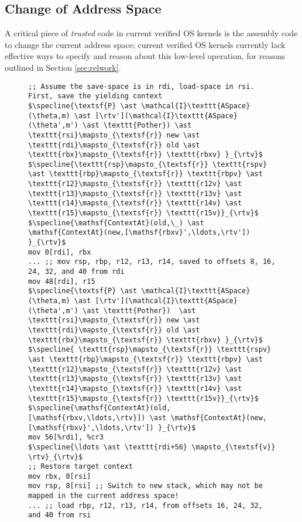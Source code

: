 \subsection{Change of Address Space}
A critical piece of \emph{trusted} code in current verified OS kernels is the assembly code to change the current address space; current verified OS kernels currently 
lack effective ways to specify and reason about this low-level operation, for reasons outlined in Section \ref{sec:relwork}.
\begin{figure}\footnotesize
\begin{lstlisting}[mathescape]
;; Assume the save-space is in rdi, load-space in rsi. First, save the yielding context
$\specline{\textsf{P} \ast \mathcal{I}\texttt{ASpace}(\theta,m) \ast [\rtv'](\mathcal{I}\texttt{ASpace}(\theta',m') \ast \texttt{Pother}) \ast \texttt{rsi}\mapsto_{\textsf{r}} new \ast \texttt{rdi}\mapsto_{\textsf{r}} old \ast \texttt{rbx}\mapsto_{\textsf{r}} \texttt{rbxv} }_{\rtv}$
$\specline{\texttt{rsp}\mapsto_{\textsf{r}} \texttt{rspv} \ast \texttt{rbp}\mapsto_{\textsf{r}} \texttt{rbpv} \ast \texttt{r12}\mapsto_{\textsf{r}} \texttt{r12v} \ast \texttt{r13}\mapsto_{\textsf{r}} \texttt{r13v} \ast \texttt{r14}\mapsto_{\textsf{r}} \texttt{r14v} \ast \texttt{r15}\mapsto_{\textsf{r}} \texttt{r15v}}_{\rtv}$
$\specline{\mathsf{ContextAt}(old,\_) \ast \mathsf{ContextAt}(new,[\mathsf{rbxv}',\ldots,\rtv']) }_{\rtv}$
mov 0[rdi], rbx
... ;; mov rsp, rbp, r12, r13, r14, saved to offsets 8, 16, 24, 32, and 40 from rdi
mov 48[rdi], r15
$\specline{\textsf{P} \ast \mathcal{I}\texttt{ASpace}(\theta,m) \ast [\rtv'](\mathcal{I}\texttt{ASpace}(\theta',m') \ast \texttt{Pother})  \ast  \texttt{rsi}\mapsto_{\textsf{r}} new \ast \texttt{rdi}\mapsto_{\textsf{r}} old \ast \texttt{rbx}\mapsto_{\textsf{r}} \texttt{rbxv} }_{\rtv}$
$\specline{ \texttt{rsp}\mapsto_{\textsf{r}} \texttt{rspv} \ast \texttt{rbp}\mapsto_{\textsf{r}} \texttt{rbpv} \ast \texttt{r12}\mapsto_{\textsf{r}} \texttt{r12v} \ast \texttt{r13}\mapsto_{\textsf{r}} \texttt{r13v} \ast \texttt{r14}\mapsto_{\textsf{r}} \texttt{r14v} \ast \texttt{r15}\mapsto_{\textsf{r}} \texttt{r15v}}_{\rtv}$
$\specline{\mathsf{ContextAt}(old,[\mathsf{rbxv,\ldots,\rtv}]) \ast \mathsf{ContextAt}(new,[\mathsf{rbxv}',\ldots,\rtv']) }_{\rtv}$
mov 56[%rdi], %cr3
$\specline{\ldots \ast \texttt{rdi+56} \mapsto_{\textsf{v}} \rtv}_{\rtv}$    
;; Restore target context
mov rbx, 0[rsi] 
mov rsp, 8[rsi] ;; Switch to new stack, which may not be mapped in the current address space!
... ;; load rbp, r12, r13, r14, from offsets 16, 24, 32, and 40 from rsi

\end{lstlisting}
\end{figure}
